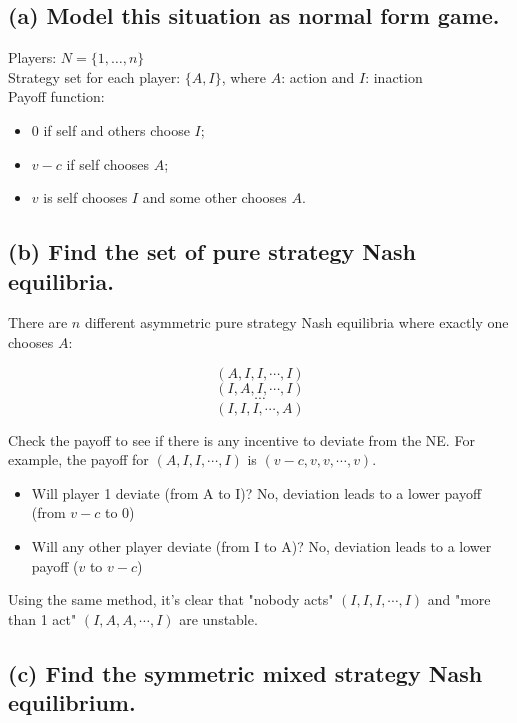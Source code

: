 \documentclass{article}
\begin{document}
\subsection*{(a) Model this situation as normal form game.}  


 Players: $N = \{1, \dots , n \}$ \\ 
 Strategy set for each player: $\{A, I \}$, where $A$: action and $I$: inaction \\ 
 Payoff function: 

\begin{itemize}
\item $0$ if self and others choose $I$; 
\item $v-c$ if self chooses $A$; 
\item $v$ is self chooses $I$ and some other chooses $A$.
\end{itemize}




%
\subsection*{(b) Find the set of pure strategy Nash equilibria. } 

There are $n$ different asymmetric pure strategy Nash equilibria where exactly one chooses $A$:

$$(A,I,I,\cdots,I)$$
$$(I,A,I,\cdots,I)$$
$$\cdots$$
$$(I,I,I,\cdots,A)$$

\begin{mdframed}[backgroundcolor=blue!20,linecolor=white]

Check the payoff to see if there is any incentive to deviate from the NE. For example, the payoff for
$(A,I,I,\cdots,I)$ is $(v-c,v,v,\cdots,v)$.

\begin{itemize}
\item Will player 1 deviate (from A to I)? No, deviation leads to a lower payoff (from $v-c$ to $0$)
\item Will any other player deviate (from I to A)? No, deviation leads to a lower payoff ($v$ to $v-c$)
\end{itemize}

Using the same method, it's clear that "nobody acts" $(I,I,I,\cdots,I)$ and "more than 1 act" $(I,A,A,\cdots,I)$ are
unstable.
\end{mdframed}


\subsection*{(c) Find the symmetric mixed strategy Nash equilibrium.}
\end{document}
